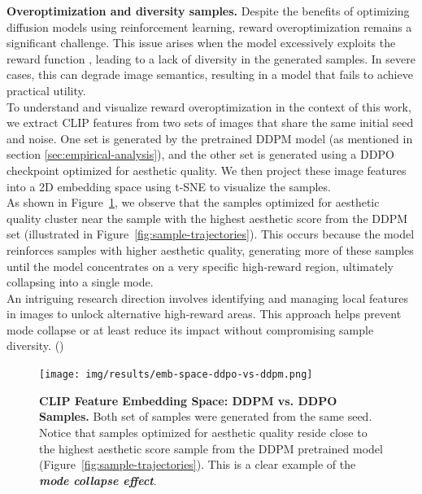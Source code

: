 \noindent\textbf{Overoptimization and diversity samples.} Despite the benefits 
of optimizing diffusion models using reinforcement learning, reward overoptimization remains a significant challenge. This issue arises when the model excessively exploits the reward function \cite{gao2023scaling}, leading to a lack of diversity in the generated samples. In severe cases, this can degrade image semantics, resulting in a model that fails to achieve practical utility. \\

\noindent To understand and visualize reward overoptimization in the context of this work, we extract CLIP \cite{radford2021learning} features from two sets of images that share the
same initial seed and noise. One set is generated by the pretrained DDPM model (as mentioned in section \ref{sec:empirical-analysis}), and the other set is generated using a DDPO checkpoint optimized for aesthetic quality. We then  project these image features into a 2D embedding space using t-SNE \cite{van2008visualizing} to visualize the samples. \\

\noindent As shown in Figure~\ref{fig:clip-emb-ddpo-vs-ddpm}, we observe that the samples optimized for aesthetic quality cluster near the sample with the highest aesthetic score from the DDPM set (illustrated in Figure~\ref{fig:sample-trajectories}). This occurs because the model reinforces samples with higher aesthetic quality, generating more of these samples until the
model concentrates on a very specific high-reward region, ultimately collapsing into a single mode. \\

\noindent An intriguing research direction involves identifying and managing local features in images to unlock alternative high-reward areas. This approach helps prevent mode collapse or at least reduce its impact without compromising sample diversity. () \\
\begin{figure}[ht]
  \centering
  \texttt{[image: img/results/emb-space-ddpo-vs-ddpm.png]}
  \vspace{-45pt}  %
    \captionsetup{width=\textwidth} %
    \caption{\textbf{CLIP Feature Embedding Space: DDPM vs. DDPO Samples.} Both set of samples were generated from the same seed. Notice that samples optimized for aesthetic quality reside close to the highest aesthetic score sample from the DDPM pretrained model (Figure~\ref{fig:sample-trajectories}). This is a clear example of the \textit{\textbf{mode collapse effect}}.}
    \label{fig:clip-emb-ddpo-vs-ddpm}
\end{figure}

